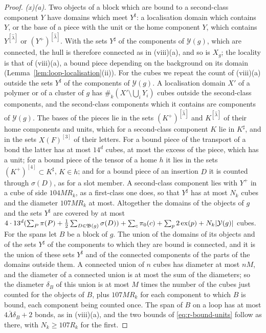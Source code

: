 \documentclass[11pt]{preprint}
\DeclarePairedDelimiter{\abs}{\lvert}{\rvert}
\numberwithin{equation}{section}
\theoremstyle{definition}
\theoremstyle{remark}
\theoremstyle{plain}
\begin{document}
\begin{proof}
\emph{(x)(a).} Two objects of a block which are bound to a second-class component $Y$ have domains which meet $Y^\sharp$: a localisation domain which contains $Y$, or the base of a piece with the unit or the home component $Y$, which contains $Y^{[\hat\lambda]}$ or $(Y^+)^{[\hat\lambda]}$. With the sets $Y^\sharp$ of the components of $\mathcal Y(g)$, which are connected, the hull is therefore connected as in (viii)(a), and so is $X_g$; the locality is that of (viii)(a), a bound piece depending on the background on its domain (Lemma~\ref{lem:loop-localisation}(ii)). For the cubes we repeat the count of (viii)(a) outside the sets $Y^\sharp$ of the components of $\mathcal Y(g)$. A localisation domain $X'$ of a polymer or of a cluster of $g$ has $\#_k(X' \setminus \bigcup_iY_i)$ cubes outside the second-class components, and the second-class components which it contains are components of $\mathcal Y(g)$. The bases of the pieces lie in the sets $(K^+)^{[\hat\lambda]}$ and $K^{[\hat\lambda]}$ of their home components and units, which for a second-class component $K$ lie in $K^\sharp$, and in the sets $X(F)^{[3]}$ of their letters. For a bound piece of the transport of a bond the latter has at most $14^d$ cubes, at most the excess of the piece, which has a unit; for a bound piece of the tensor of a home $h$ it lies in the sets $(K^+)^{[4]} \subset K^\sharp$, $K \in h$; and for a bound piece of an insertion $D$ it is counted through $\sigma(D)$, as for a slot member. A second-class component lies with $Y^+$ in a cube of side $104MR_k$, as a first-class one does, so that $Y^\sharp$ has at most $N_k$ cubes and the diameter $107MR_k$ at most. Altogether the domains of the objects of $g$ and the sets $Y^\sharp$ are covered by at most $4 \cdot 13^d(\sum_P\pi(P) + \frac12\sum_{D \in \mathfrak B(g)}\sigma(D)) + \sum_c\pi_0(c) + \sum_p2\operatorname{ex}(p) + N_k\abs{\mathcal Y(g)}$ cubes. For the spans let $B$ be a block of $g$. The union of the domains of its objects and of the sets $Y^\sharp$ of the components to which they are bound is connected, and it is the union of these sets $Y^\sharp$ and of the connected components of the parts of the domains outside them. A connected union of $n$ cubes has diameter at most $nM$, and the diameter of a connected union is at most the sum of the diameters; so the diameter $\delta_B$ of this union is at most $M$ times the number of the cubes just counted for the objects of $B$, plus $107MR_k$ for each component to which $B$ is bound, each component being counted once. The span of $B$ on a loop has at most $4\bar\Lambda\delta_B + 2$ bonds, as in (viii)(a), and the two bounds of \eqref{eq:r-bound-units} follow as there, with $N_k \geq 107R_k$ for the first.


\end{proof}
\end{document}
